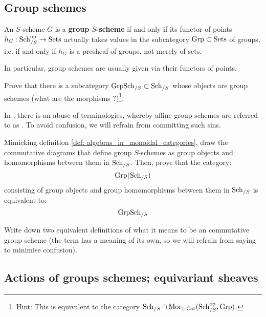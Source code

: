     \subsection{Group schemes}
        \begin{definition} \label{def: group_schemes}
            An $S$-scheme $G$ is a \textbf{group $S$-scheme} if and only if its functor of points $h_G: \mathrm{Sch}_{/S}^{\mathrm{op}} \to \mathrm{Sets}$ actually takes values in the subcategory $\mathrm{Grp} \subset \mathrm{Sets}$ of groups, i.e. if and only if $h_G$ is a presheaf of groups, not merely of sets.

            In particular, group schemes are usually given via their functors of points.
        \end{definition}
        \begin{question}
            Prove that there is a subcategory $\mathrm{Grp}\mathrm{Sch}_{/S} \subset \mathrm{Sch}_{/S}$ whose objects are group schemes (what are the morphisms ?)\footnote{Hint: This is equivalent to the category $\mathrm{Sch}_{/S} \cap \mathrm{Mor}_{1\text{-}\mathrm{Cat}}(\mathrm{Sch}_{/S}^{\mathrm{op}}, \mathrm{Grp})$.}.
        \end{question}
        \begin{remark}
            In \cite{jantzen_representations_of_algebraic_groups}, there is an abuse of terminologies, whereby affine group schemes are referred to as . To avoid confusion, we will refrain from committing such sins.
        \end{remark}
        \begin{question}
            Mimicking definition \ref{def: algebras_in_monoidal_categories}, draw the commutative diagrams that define group $S$-schemes as group objects and homomorphisms between them in $\mathrm{Sch}_{/S}$. Then, prove that the category:
                $$\mathrm{Grp}(\mathrm{Sch}_{/S})$$
            consisting of group objects and group homomorphisms between them in $\mathrm{Sch}_{/S}$ is equivalent to:
                $$\mathrm{Grp}\mathrm{Sch}_{/S}$$
        \end{question}
        \begin{question}
            Write down two equivalent definitions of what it means to be an commutative group scheme (the term  has a meaning of its own, so we will refrain from saying  to minimise confusion).
        \end{question}
        
    \subsection{Actions of groups schemes; equivariant sheaves}
        
